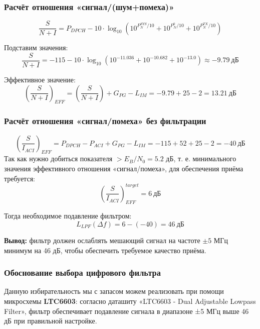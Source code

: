 \documentclass[a4paper,12pt]{article}
\begin{document}
\subsubsection{Расчёт отношения «сигнал/(шум+помеха)»}
\begin{equation}
\frac{S}{N + I} = P_{DPCH} - 10 \cdot \log_{10} \left(10^{P_{N}^{SYS}/10} + 10^{P_{N}^{0}/10} + 10^{P_{N}^{TX}/10} \right)
\end{equation}

Подставим значения:
\begin{equation}
\frac{S}{N + I} = -115 - 10 \cdot \log_{10} \left(10^{-11.036} + 10^{-10.682} + 10^{-13.0} \right) \approx -9.79\ \text{дБ}
\end{equation}

Эффективное значение:
\begin{equation}
\left( \frac{S}{N + I} \right)_{EFF} = \left( \frac{S}{N + I} \right) + G_{PG} - L_{IM} = -9.79 + 25 - 2 = 13.21\ \text{дБ}
\end{equation}



\subsubsection{Расчёт отношения «сигнал/помеха» без фильтрации}
\begin{equation}
\left( \frac{S}{I_{ACI}} \right)_{EFF} = P_{DPCH} - P_{ACI} + G_{PG} - L_{IM} = -115 + 52 + 25 - 2 = -40\ \text{дБ}
\end{equation}
Так как нужно добиться показателя $>E_B/N_0 =5.2$ дБ, т. е.  минимального значения эффективного отношения «сигнал/помеха», для обеспечения приёма требуется:
\begin{equation}
\left( \frac{S}{I_{ACI}} \right)_{EFF}^{target} = 6\ \text{дБ}
\end{equation}

Тогда необходимое подавление фильтром:
\begin{equation}
L_{LPF}(\Delta f) = 6 - (-40) = 46\ \text{дБ}
\end{equation}

\textbf{Вывод:} фильтр должен ослаблять мешающий сигнал на частоте $\pm5$ МГц минимум на 46 дБ, чтобы обеспечить требуемое качество приёма.  

\subsubsection{Обоснование выбора цифрового фильтра}
Данную избирательность мы с запасом можем реализовать при помощи микросхемы \textbf{LTC6603}: согласно даташиту «LTC6603 - Dual Adjustable Lowpass Filter», фильтр обеспечивает подавление сигнала в диапазоне ±5 МГц выше 46 дБ при правильной настройке.
\end{document}
